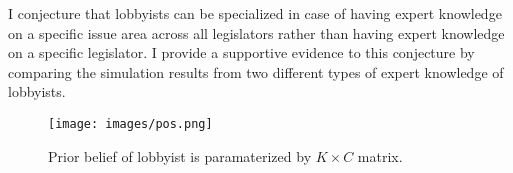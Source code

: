 \documentclass{article}
\begin{document}
I conjecture that lobbyists can be specialized 
in case of having expert knowledge on a specific issue area across all legislators
rather than having expert knowledge on a specific legislator.
I provide a supportive evidence to this conjecture by comparing the simulation results 
from two different types of expert knowledge of lobbyists.




\begin{figure}[h]
    \centering
    \texttt{[image: images/pos.png]}
    \caption{Prior belief of lobbyist is paramaterized by $K \times C$ matrix.}
    \label{fig:mesh1}
\end{figure}






\end{document}
